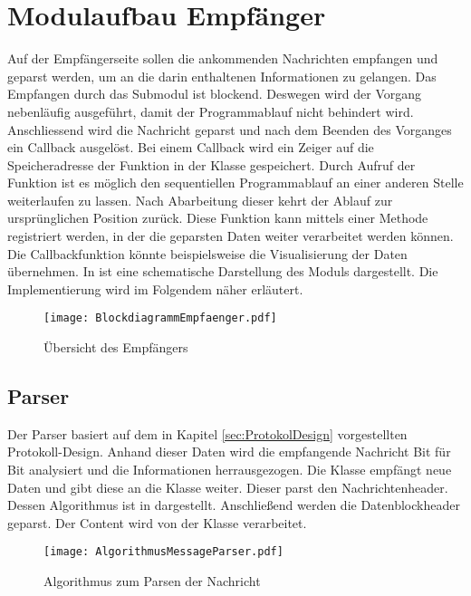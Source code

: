 \section{Modulaufbau Empf{\"a}nger}

Auf der Empf{\"a}ngerseite sollen die ankommenden Nachrichten empfangen und geparst
werden, um an die darin enthaltenen Informationen zu gelangen. Das Empfangen
durch das Submodul  ist blockend. Deswegen wird der Vorgang
nebenl{\"a}ufig ausgef{\"u}hrt, damit der Programmablauf nicht behindert wird. Anschliessend wird
die Nachricht geparst und nach dem Beenden des Vorganges ein Callback
ausgel{\"o}st. Bei einem Callback wird ein Zeiger auf die Speicheradresse der
Funktion in der Klasse gespeichert. Durch Aufruf der Funktion ist es
m{\"o}glich den sequentiellen Programmablauf an einer anderen Stelle
weiterlaufen zu lassen. Nach Abarbeitung dieser kehrt der Ablauf zur
urspr{\"u}nglichen Position zur{\"u}ck. Diese Funktion kann mittels einer
Methode registriert werden, in der die geparsten Daten weiter verarbeitet werden
k{\"o}nnen.
Die Callbackfunktion k{\"o}nnte beispielsweise die Visualisierung der Daten
{\"u}bernehmen. \newline 
In  ist eine schematische Darstellung des
Moduls dargestellt. Die Implementierung wird im Folgendem n{\"a}her erl{\"a}utert.

\begin{figure}[H]
\centering
\texttt{[image: BlockdiagrammEmpfaenger.pdf]}
\caption{{\"U}bersicht des Empf{\"a}ngers}
\label{fig:BlockdiagrammEmpfaenger}
\end{figure}

\subsection{Parser}

Der Parser basiert auf dem in Kapitel \ref{sec:ProtokolDesign}
vorgestellten Protokoll-Design.
Anhand dieser Daten wird die empfangende Nachricht Bit f{\"u}r Bit analysiert
und die Informationen herrausgezogen. 
Die Klasse  empf{\"a}ngt neue Daten und gibt diese an
die Klasse  weiter. Dieser parst den Nachrichtenheader.
Dessen Algorithmus ist in  dargestellt.
Anschlie{\ss}end werden die Datenblockheader geparst. Der Content wird von der
Klasse  verarbeitet.

\begin{figure}[H]
\centering
\texttt{[image: AlgorithmusMessageParser.pdf]}
\caption{Algorithmus zum Parsen der Nachricht}
\label{fig:AlgorithmusMessageParser}
\end{figure}

